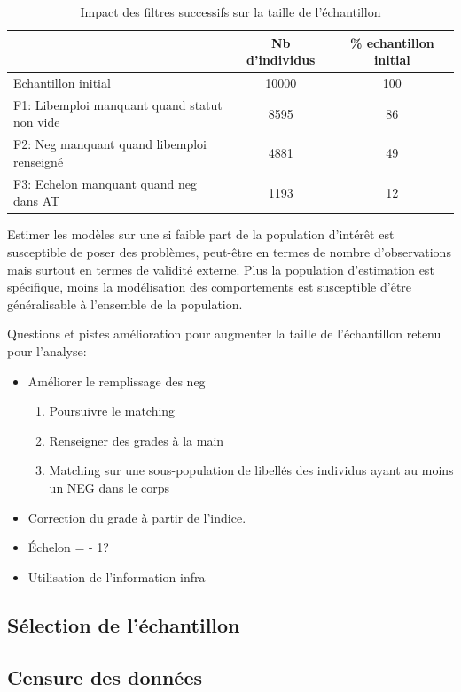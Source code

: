 \documentclass[11pt,a4paper]{article}
\begin{document}
\begin{table}[h!]
\centering
\caption{Impact des filtres successifs sur la taille de l'échantillon} 
\label{filters}
\begin{tabular}{lcc}
\toprule
 & Nb d'individus & \% echantillon initial \\ 
  \hline
Echantillon initial & 10000 & 100 \\ 
F1: Libemploi manquant quand statut non vide & 8595 & 86 \\ 
  F2: Neg manquant quand libemploi renseigné & 4881 & 49 \\ 
  F3: Echelon manquant quand neg dans AT & 1193 & 12 \\ 
\bottomrule
\end{tabular}
\end{table}


Estimer les modèles sur une si faible part de la population d'intérêt est susceptible de poser des problèmes, peut-être en termes de nombre d'observations mais surtout en termes de validité externe. Plus la population d'estimation est spécifique, moins la modélisation des comportements est susceptible d'être généralisable à l'ensemble de la population. 


Questions et pistes amélioration pour augmenter la taille de l'échantillon retenu pour l'analyse: 
\begin{itemize}[leftmargin=1cm ,parsep=0cm,itemsep=0cm,topsep=0cm] 
\item Améliorer le remplissage des neg 
	\begin{enumerate}[leftmargin=1cm ,parsep=0cm,itemsep=0cm,topsep=0cm] 
	\item Poursuivre le matching
	\item Renseigner des grades à la main 
	\item Matching sur une sous-population de libellés des individus ayant au moins un NEG dans le corps
	\end{enumerate}
\item Correction du grade à partir de l'indice. 
\item Échelon = - 1?
\item Utilisation de l'information infra
\end{itemize}


\subsection{Sélection de l'échantillon}


\subsection{Censure des données}
\end{document}
